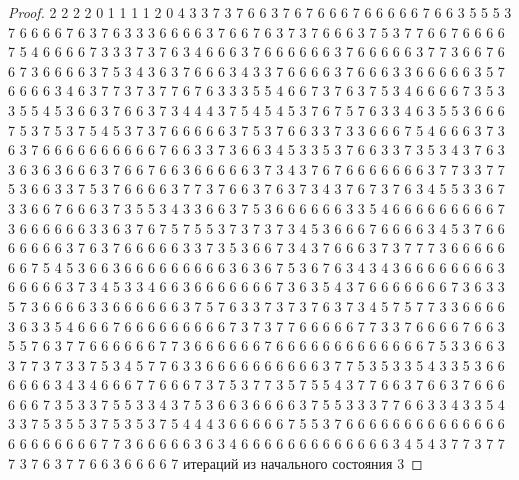\begin{proof}
	2 2 2 2 0 1 1 1 1 2 0 4 3 3 7 3 7 6 6 3 7 6 7 6 6 6 7 6 6 6 6 6 7 6 6 3 5 5 5 3 7 6 6 6 6 7 6 3 7 6 3 3 3 6 6 6 6 3 7 6 6 7 6 3 7 3 7 6 6 6 3 7 5 3 7 7 6 6 7 6 6 6 6 7 5 4 6 6 6 6 7 3 3 3 7 3 7 6 3 4 6 6 6 3 7 6 6 6 6 6 6 3 7 6 6 6 6 6 3 7 7 3 6 6 7 6 6 7 3 6 6 6 6 3 7 5 3 4 3 6 3 7 6 6 6 3 4 3 3 7 6 6 6 6 3 7 6 6 6 3 3 6 6 6 6 6 3 5 7 6 6 6 6 3 4 6 3 7 7 3 7 3 7 7 6 7 6 3 3 3 5 5 4 6 6 7 3 7 6 3 7 5 3 4 6 6 6 6 7 3 5 3 3 5 5 4 5 3 6 6 3 7 6 6 3 7 3 4 4 4 3 7 5 4 5 4 5 3 7 6 7 5 7 6 3 3 4 6 3 5 5 3 6 6 6 7 5 3 7 5 3 7 5 4 5 3 7 3 7 6 6 6 6 6 3 7 5 3 7 6 6 3 3 7 3 3 6 6 6 7 5 4 6 6 6 3 7 3 6 3 7 6 6 6 6 6 6 6 6 6 6 7 6 6 3 3 7 3 6 6 3 4 5 3 3 5 3 7 6 6 3 3 7 3 5 3 4 3 7 6 3 3 6 3 6 3 6 6 6 3 7 6 6 7 6 6 3 6 6 6 6 6 3 7 3 4 3 7 6 7 6 6 6 6 6 6 6 3 7 7 3 3 7 7 5 3 6 6 3 3 7 5 3 7 6 6 6 6 3 7 7 3 7 6 6 3 7 6 3 7 3 4 3 7 6 7 3 7 6 3 4 5 5 3 3 6 7 3 3 6 6 7 6 6 6 3 7 3 5 5 3 4 3 3 6 6 3 7 5 3 6 6 6 6 6 6 3 3 5 4 6 6 6 6 6 6 6 6 6 7 3 6 6 6 6 6 6 3 3 6 3 7 6 7 5 7 5 5 3 7 3 7 3 7 3 4 5 3 6 6 6 7 6 6 6 6 3 4 5 3 7 6 6 6 6 6 6 6 3 7 6 3 7 6 6 6 6 6 3 3 7 3 5 3 6 6 7 3 4 3 7 6 6 6 3 7 3 7 7 7 3 6 6 6 6 6 6 6 7 5 4 5 3 6 6 3 6 6 6 6 6 6 6 6 6 3 6 3 6 7 5 3 6 7 6 3 4 3 4 3 6 6 6 6 6 6 6 6 3 6 6 6 6 6 3 7 3 4 5 3 3 4 6 6 3 6 6 6 6 6 6 6 7 3 6 3 5 4 3 7 6 6 6 6 6 6 6 7 3 6 3 3 5 7 3 6 6 6 6 3 3 6 6 6 6 6 6 3 7 5 7 6 3 3 7 3 7 3 7 6 3 7 3 4 5 7 5 7 7 3 3 6 6 6 6 3 6 3 3 5 4 6 6 6 7 6 6 6 6 6 6 6 6 6 7 3 7 3 7 7 6 6 6 6 6 7 7 3 3 7 6 6 6 6 7 6 6 3 5 5 7 6 3 7 7 6 6 6 6 6 6 7 7 3 6 6 6 6 6 6 7 6 6 6 6 6 6 6 6 6 6 6 6 6 7 5 3 3 6 6 3 3 7 7 3 7 3 3 7 5 3 4 5 7 7 6 3 3 6 6 6 6 6 6 6 6 6 6 3 7 7 5 3 5 3 3 5 4 3 3 5 3 6 6 6 6 6 6 3 4 3 4 6 6 6 7 7 6 6 6 7 3 7 5 3 7 7 3 5 7 5 5 4 3 7 7 6 6 3 7 6 6 3 7 6 6 6 6 6 6 7 3 5 3 3 7 5 5 3 3 4 3 7 5 3 6 6 3 6 6 6 6 3 7 5 5 3 3 3 7 7 6 6 3 3 4 3 3 5 4 3 3 7 5 3 5 5 3 7 5 3 5 3 7 5 4 4 4 3 6 6 6 6 6 7 5 5 3 7 6 6 6 6 6 6 6 6 6 6 6 6 6 6 6 6 6 6 6 6 6 6 7 7 3 6 6 6 6 6 3 6 3 4 6 6 6 6 6 6 6 6 6 6 6 6 6 3 4 5 4 3 7 7 3 7 7 7 3 7 6 3 7 7 6 6 3 6 6 6 6 7 
	\newline
	 итераций из начального состояния 3
	\newline

\end{proof}
